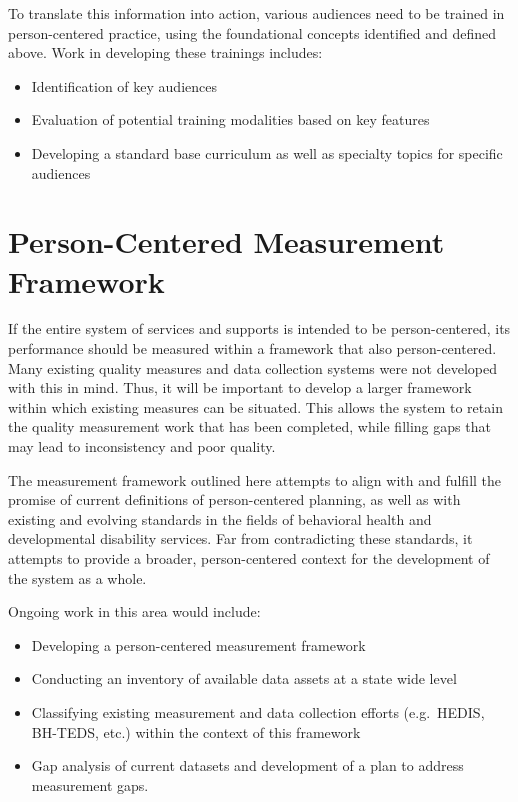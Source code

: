 \documentclass[
]{book}
\providecommand{\tightlist}{%
  \setlength{\itemsep}{0pt}\setlength{\parskip}{0pt}}
\begin{document}
To translate this information into action, various audiences need to be trained in person-centered practice, using the foundational concepts identified and defined above. Work in developing these trainings includes:

\begin{itemize}
\tightlist
\item
  Identification of key audiences
\item
  Evaluation of potential training modalities based on key features
\item
  Developing a standard base curriculum as well as specialty topics for specific audiences
\end{itemize}

\hypertarget{measure}{%
\chapter{Person-Centered Measurement Framework}\label{measure}}

If the entire system of services and supports is intended to be person-centered, its performance should be measured within a framework that also person-centered. Many existing quality measures and data collection systems were not developed with this in mind. Thus, it will be important to develop a larger framework within which existing measures can be situated. This allows the system to retain the quality measurement work that has been completed, while filling gaps that may lead to inconsistency and poor quality.

The measurement framework outlined here attempts to align with and fulfill the promise of current definitions of person-centered planning, as well as with existing and evolving standards in the fields of behavioral health and developmental disability services. Far from contradicting these standards, it attempts to provide a broader, person-centered context for the development of the system as a whole.

Ongoing work in this area would include:

\begin{itemize}
\tightlist
\item
  Developing a person-centered measurement framework
\item
  Conducting an inventory of available data assets at a state wide level
\item
  Classifying existing measurement and data collection efforts (e.g.~HEDIS, BH-TEDS, etc.) within the context of this framework
\item
  Gap analysis of current datasets and development of a plan to address measurement gaps.
\end{itemize}
\end{document}

